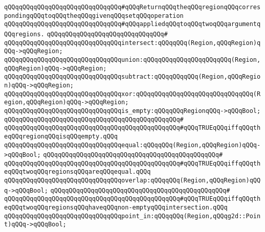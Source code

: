\newline
\verb|qQQqqQQqqQQqqQQqqQQqqQQqqQQqqQQq#qQQqReturnqQQqtheqQQqregionqQQqcorrespondingqQQqtoqQQqtheqQQqgivenqQQqsetqQQqoperation|\newline
\verb|qQQqqQQqqQQqqQQqqQQqqQQqqQQqqQQq#qQQqappliedqQQqtoqQQqtwoqQQqargumentqQQqregions.|\newline
\verb|qQQqqQQqqQQqqQQqqQQqqQQqqQQqqQQq#|\newline
\verb|qQQqqQQqqQQqqQQqqQQqqQQqqQQqqQQqintersect:qQQqqQQq(Region,qQQqRegion)qQQq->qQQqRegion;|\newline
\verb|qQQqqQQqqQQqqQQqqQQqqQQqqQQqqQQqunion:qQQqqQQqqQQqqQQqqQQqqQQq(Region,qQQqRegion)qQQq->qQQqRegion;|\newline
\verb|qQQqqQQqqQQqqQQqqQQqqQQqqQQqqQQqsubtract:qQQqqQQqqQQq(Region,qQQqRegion)qQQq->qQQqRegion;|\newline
\verb|qQQqqQQqqQQqqQQqqQQqqQQqqQQqqQQqxor:qQQqqQQqqQQqqQQqqQQqqQQqqQQqqQQq(Region,qQQqRegion)qQQq->qQQqRegion;|\newline
\newline
\verb|qQQqqQQqqQQqqQQqqQQqqQQqqQQqqQQqis_empty:qQQqqQQqRegionqQQq->qQQqBool;|\newline
\verb|qQQqqQQqqQQqqQQqqQQqqQQqqQQqqQQqqQQqqQQqqQQqqQQq#|\newline
\verb|qQQqqQQqqQQqqQQqqQQqqQQqqQQqqQQqqQQqqQQqqQQqqQQq#qQQqTRUEqQQqiffqQQqtheqQQqregionqQQqisqQQqempty.qQQq|\newline
\newline
\verb|qQQqqQQqqQQqqQQqqQQqqQQqqQQqqQQqequal:qQQqqQQq(Region,qQQqRegion)qQQq->qQQqBool;|\newline
\verb|qQQqqQQqqQQqqQQqqQQqqQQqqQQqqQQqqQQqqQQqqQQqqQQq#|\newline
\verb|qQQqqQQqqQQqqQQqqQQqqQQqqQQqqQQqqQQqqQQqqQQqqQQq#qQQqTRUEqQQqiffqQQqtheqQQqtwoqQQqregionsqQQqareqQQqequal.qQQq|\newline
\newline
\verb|qQQqqQQqqQQqqQQqqQQqqQQqqQQqqQQqoverlap:qQQqqQQq(Region,qQQqRegion)qQQq->qQQqBool;|\newline
\verb|qQQqqQQqqQQqqQQqqQQqqQQqqQQqqQQqqQQqqQQqqQQqqQQq#|\newline
\verb|qQQqqQQqqQQqqQQqqQQqqQQqqQQqqQQqqQQqqQQqqQQqqQQq#qQQqTRUEqQQqiffqQQqtheqQQqtwoqQQqregionsqQQqhaveqQQqnon-emptyqQQqintersection.qQQq|\newline
\newline
\verb|qQQqqQQqqQQqqQQqqQQqqQQqqQQqqQQqpoint_in:qQQqqQQq(Region,qQQqg2d::Point)qQQq->qQQqBool;|\newline
